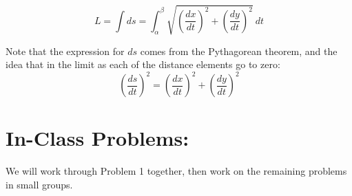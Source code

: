 \[
L= \int ds = \int_{\alpha}^{\beta} \sqrt{\left(\frac{dx}{dt}\right)^2 + \left(\frac{dy}{dt}\right)^2}\ dt %
\]

Note that the expression for \(ds\) comes from the Pythagorean theorem, and the idea that in the limit as each of the distance elements go to zero:
\[
\left(\frac{ds}{dt}\right)^2 = \left(\frac{dx}{dt}\right)^2 + \left(\frac{dy}{dt}\right)^2
\]
%



\section*{In-Class Problems:}

We will work through Problem 1 together, then work on the remaining problems in small groups.

\vfill

%

